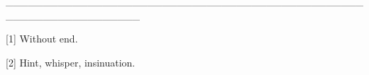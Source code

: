 __________________________________________________________________

[1] Without end.

[2] Hint, whisper, insinuation.
